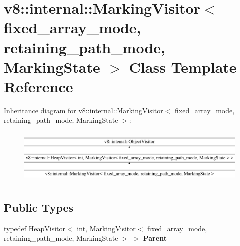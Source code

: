 \hypertarget{classv8_1_1internal_1_1MarkingVisitor}{}\section{v8\+:\+:internal\+:\+:Marking\+Visitor$<$ fixed\+\_\+array\+\_\+mode, retaining\+\_\+path\+\_\+mode, Marking\+State $>$ Class Template Reference}
\label{classv8_1_1internal_1_1MarkingVisitor}
Inheritance diagram for v8\+:\+:internal\+:\+:Marking\+Visitor$<$ fixed\+\_\+array\+\_\+mode, retaining\+\_\+path\+\_\+mode, Marking\+State $>$\+:\begin{figure}[H]
\begin{center}
\leavevmode
\includegraphics[height=2.722852cm]{classv8_1_1internal_1_1MarkingVisitor}
\end{center}
\end{figure}
\subsection*{Public Types}
\begin{DoxyCompactItemize}
\item 
\mbox{\label{classv8_1_1internal_1_1MarkingVisitor_abf50522a455b040a4d68c80d54635667}} 
typedef \mbox{\hyperlink{classv8_1_1internal_1_1HeapVisitor}{Heap\+Visitor}}$<$ \mbox{\hyperlink{classint}{int}}, \mbox{\hyperlink{classv8_1_1internal_1_1MarkingVisitor}{Marking\+Visitor}}$<$ fixed\+\_\+array\+\_\+mode, retaining\+\_\+path\+\_\+mode, Marking\+State $>$ $>$ {\bfseries Parent}
\end{DoxyCompactItemize}
